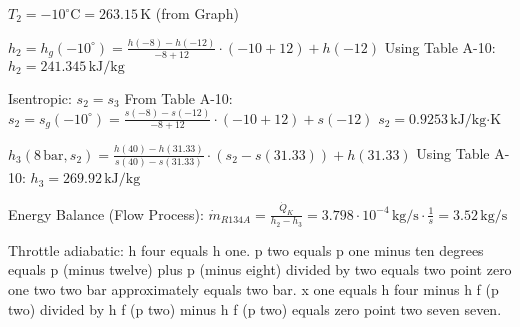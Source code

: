 \( T_2 = -10^\circ \text{C} = 263.15 \, \text{K} \)  
(from Graph)  

\( h_2 = h_g(-10^\circ) = \frac{h(-8) - h(-12)}{-8 + 12} \cdot (-10 + 12) + h(-12) \)  
Using Table A-10:  
\( h_2 = 241.345 \, \text{kJ/kg} \)  

Isentropic:  
\( s_2 = s_3 \)  
From Table A-10:  
\( s_2 = s_g(-10^\circ) = \frac{s(-8) - s(-12)}{-8 + 12} \cdot (-10 + 12) + s(-12) \)  
\( s_2 = 0.9253 \, \text{kJ/kg·K} \)  

\( h_3 (8 \, \text{bar}, s_2) = \frac{h(40) - h(31.33)}{s(40) - s(31.33)} \cdot (s_2 - s(31.33)) + h(31.33) \)  
Using Table A-10:  
\( h_3 = 269.92 \, \text{kJ/kg} \)  

Energy Balance (Flow Process):  
\( \dot{m}_{R134A} = \frac{\dot{Q}_K}{h_2 - h_3} = 3.798 \cdot 10^{-4} \, \text{kg/s} \cdot \frac{1}{s} = 3.52 \, \text{kg/s} \)

Throttle adiabatic: h four equals h one.  
p two equals p one minus ten degrees equals p (minus twelve) plus p (minus eight) divided by two equals two point zero one two two bar approximately equals two bar.  
x one equals h four minus h f (p two) divided by h f (p two) minus h f (p two) equals zero point two seven seven.